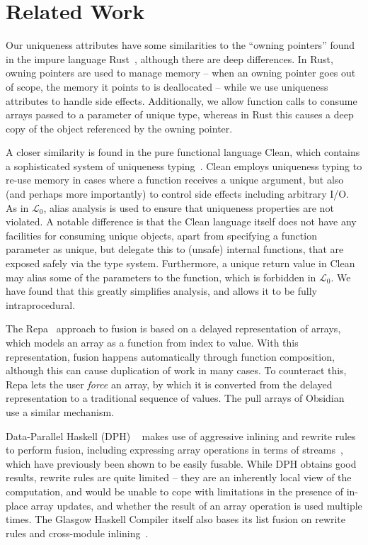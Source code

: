 \documentclass{sigplanconf}  %
\newcommand{\LO}{$\mathcal{L}_0$}
\begin{document}
\section{Related Work}
\label{sec:RelWork}

Our uniqueness attributes have some similarities to the ``owning
pointers'' found in the impure language Rust~\cite{rust}, although
there are deep differences.  In Rust, owning pointers are used to
manage memory -- when an owning pointer goes out of scope, the memory
it points to is deallocated -- while we use uniqueness attributes to
handle side effects.  Additionally, we allow function calls to consume
arrays passed to a parameter of unique type, whereas in Rust this
causes a deep copy of the object referenced by the owning pointer.

A closer similarity is found in the pure functional language Clean,
which contains a sophisticated system of uniqueness
typing~\cite{barendsen1996uniqueness}.  Clean employs uniqueness
typing to re-use memory in cases where a function receives a unique
argument, but also (and perhaps more importantly) to control side
effects including arbitrary I/O.  As in \LO{}, alias analysis is used
to ensure that uniqueness properties are not violated.  A notable
difference is that the Clean language itself does not have any
facilities for consuming unique objects, apart from specifying a
function parameter as unique, but delegate this to (unsafe) internal
functions, that are exposed safely via the type system.  Furthermore,
a unique return value in Clean may alias some of the parameters to the
function, which is forbidden in \LO{}.  We have found that this
greatly simplifies analysis, and allows it to be fully
intraprocedural.

The Repa~\cite{keller2010regular} approach to fusion is based on a
delayed representation of arrays, which models an array as a function
from index to value.  With this representation, fusion happens
automatically through function composition, although this can cause
duplication of work in many cases.  To counteract this, Repa lets the
user {\em force} an array, by which it is converted from the
delayed representation to a traditional sequence of values.  The pull
arrays of Obsidian~\cite{claessen2012expressive} use a similar
mechanism.

Data-Parallel Haskell (DPH) ~\cite{chakravarty2007data} makes use of
aggressive inlining and rewrite rules to perform fusion, including
expressing array operations in terms of
streams~\cite{coutts2007rewriting}, which have previously been shown
to be easily fusable.  While DPH obtains good results, rewrite rules
are quite limited -- they are an inherently local view of the
computation, and would be unable to cope with limitations in the
presence of in-place array updates, and whether the result of an array
operation is used multiple times.  The Glasgow Haskell Compiler itself
also bases its list fusion on rewrite rules and cross-module
inlining~\cite{jones2001playing}.
\end{document}
